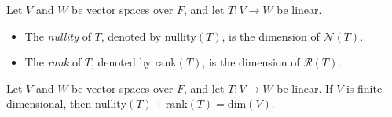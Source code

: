 \begin{definition}
  Let $V$ and $W$ be vector spaces over $F$, and let $T: V \to W$ be linear.
  \begin{itemize}
    \item The \emph{nullity} of $T$, denoted by $\mathrm{nullity}(T)$,
      is the dimension of $\mathcal{N}(T)$.
    \item The \emph{rank} of $T$, denoted by $\mathrm{rank}(T)$,
      is the dimension of $\mathcal{R}(T)$.
  \end{itemize}
\end{definition}

\begin{theorem}\label{thm:rank-nullity}
  Let $V$ and $W$ be vector spaces over $F$, and let $T: V \to W$ be linear.
  If $V$ is finite-dimensional, then
  $\mathrm{nullity}(T) + \mathrm{rank}(T) = \mathrm{dim}(V)$.
\end{theorem}
